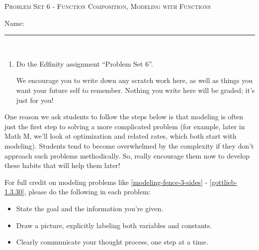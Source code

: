 \documentclass{article}
\newcommand{\doedfinity}[2][\newpage]{
  \begin{problem}[#1]
    Do the Edfinity assignment ``Problem Set #2''.

    We encourage you to write down any scratch work here, as well as
    things you want your future self to remember. Nothing you write
    here will be graded; it's just for you!
  \end{problem}
}
\begin{document}
\begin{center}
  \large\textsc{Problem Set 6 - Function Composition, Modeling with Functions}\vspace{.5in}
  
   \large Name: \rule{5cm}{0.15mm}\\
\end{center}

\begin{enumerate}
\item  {}

  \doedfinity{6}

\end{enumerate}
\begin{workshop}
  One reason we ask students to follow the steps below is that
  modeling is often just the first step to solving a more complicated
  problem (for example, later in Math M, we'll look at optimization
  and related rates, which both start with modeling). Students tend to
  become overwhelmed by the complexity if they don't approach such
  problems methodically. So, really encourage them now to develop
  these habits that will help them later!  
\end{workshop}

For full credit on modeling problems like \ref{modeling-fence-3-sides} - \ref{gottlieb-1.3.30}, please do the following in each problem:
{
  \begin{itemize}[nosep]
  \item State the goal and the information you're given.
  \item Draw a picture, explicitly labeling both variables and constants.
  \item Clearly communicate your thought process, one step at a time. 
  \end{itemize}
}
\end{document}
